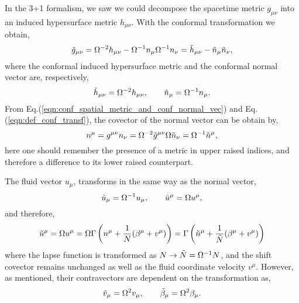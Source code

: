 In the 3+1 formalism, we saw we could decompose the spacetime metric $g_{\mu\nu}$ into an induced hypersurface metric $h_{\mu\nu}$. With the conformal transformation we obtain,
\begin{equation}
    \Tilde{g}_{\mu\nu}=\Omega^{-2}h_{\mu\nu}-\Omega^{-1}n_\mu\Omega^{-1}n_\nu=\Tilde{h}_{\mu\nu}-\Tilde{n}_\mu\Tilde{n}_\nu,
    \label{eqn:conf_metric_decomp}
\end{equation}
where the conformal induced hypersurface metric and the conformal normal vector are, respectively,
\begin{equation}
    \Tilde{h}_{\mu\nu}=\Omega^{-2}h_{\mu\nu}, \qquad \Tilde{n}_\mu=\Omega^{-1}n_\mu.
    \label{eqn:conf_spatial_metric_and_conf_normal_vec}
\end{equation}
From Eq.(\ref{eqn:conf_spatial_metric_and_conf_normal_vec}) and Eq.(\ref{eqn:def_conf_transf}), the covector of the normal vector can be obtain by,
\begin{equation}
    n^\mu = g^{\mu\nu} n_\nu = \Omega^{-2} \Tilde{g}^{\mu\nu} \Omega \Tilde{n}_\nu = \Omega^{-1}\Tilde{n}^\mu,
\end{equation}
here one should remember the presence of a metric in upper raised indices, and therefore a difference to its lower raised counterpart.

The fluid vector $u_\mu$, transforms in the same way as the normal vector,
\begin{equation}
    \Tilde{u}_\mu = \Omega^{-1}u_\mu, \qquad \Tilde{u}^\mu=\Omega u^\mu, 
\end{equation}
and therefore,
\begin{equation}
    \Tilde{u}^\mu = \Omega u^\mu = \Omega \Gamma \left(n^\mu+\frac{1}{N}(\beta^\mu+v^\mu)\right) = \Gamma \left(\Tilde{n}^\mu+\frac{1}{\Tilde{N}}(\beta^\mu+v^\mu)\right)
\end{equation}
where the lapse function is transformed as $N\rightarrow \Tilde{N}=\Omega^{-1}N$, and the shift covector remains unchanged as well as the fluid coordinate velocity $v^\mu$. However, as mentioned, their contravectors are dependent on the transformation as,
\begin{equation}
    \Tilde{v}_\mu=\Omega^2 v_\mu, \qquad \Tilde{\beta}_\mu = \Omega^2 \beta_\mu.
\end{equation}

